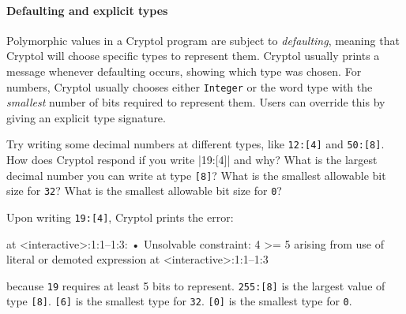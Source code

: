 \paragraph*{Defaulting and explicit types}\indDefaulting
Polymorphic values in a Cryptol program are subject to
\emph{defaulting}, meaning that Cryptol will choose specific types to
represent them. Cryptol usually prints a message whenever defaulting
occurs, showing which type was chosen. For numbers, Cryptol usually
chooses either \texttt{Integer} or the word type with the
\emph{smallest} number of bits required to represent them. Users can
override this by giving an explicit type signature.\indSignature


\restartrepl
\begin{Exercise}\label{ex:decimalType}
  Try writing some decimal numbers at different types, like
  \texttt{12:[4]} and \texttt{50:[8]}. How does Cryptol respond if
  you write \replin|19:[4]| and why? What is the largest decimal
  number you can write at type \texttt{[8]}? What is the smallest
  allowable bit size for \texttt{32}? What is the smallest allowable
  bit size for \texttt{0}?
\end{Exercise}
\begin{Answer}
  Upon writing \texttt{19:[4]}, Cryptol prints the error:
\begin{reploutVerb}
  [error] at <interactive>:1:1--1:3:
    • Unsolvable constraint:
        4 >= 5
          arising from
          use of literal or demoted expression
          at <interactive>:1:1--1:3
\end{reploutVerb}
  because \texttt{19} requires at least 5 bits to represent.
  \texttt{255:[8]} is the largest value of type \texttt{[8]}.
  \texttt{[6]} is the smallest type for \texttt{32}. \texttt{[0]} is
  the smallest type for \texttt{0}.
\end{Answer}

